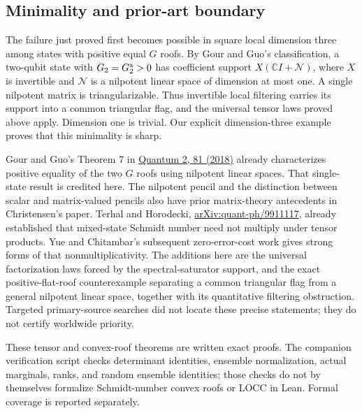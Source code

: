 \subsection{Minimality and prior-art boundary}

The failure just proved first becomes possible in square local dimension
three among states with positive equal $G$ roofs. By Gour and Guo's
classification, a two-qubit state with $G_2=G_2^{\rm a}>0$ has coefficient
support $X(\mathbb CI+\mathcal N)$, where $X$ is invertible and
$\mathcal N$ is a nilpotent linear space of dimension at most one.
A single nilpotent matrix is triangularizable. Thus invertible local
filtering carries its support into a common triangular flag, and the
universal tensor laws proved above apply. Dimension one is trivial.
Our explicit dimension-three example proves that this minimality is sharp.

Gour and Guo's Theorem 7 in
\href{https://quantum-journal.org/papers/q-2018-08-13-81/}{Quantum 2, 81 (2018)}
already characterizes positive equality of the two $G$ roofs using
nilpotent linear spaces. That single-state result is credited here.
The nilpotent pencil and the distinction between scalar and matrix-valued
pencils also have prior matrix-theory antecedents in Christensen's paper.
Terhal and Horodecki,
\href{https://arxiv.org/abs/quant-ph/9911117}{arXiv:quant-ph/9911117},
already established that mixed-state Schmidt number need not multiply
under tensor products. Yue and Chitambar's subsequent zero-error-cost
work gives strong forms of that nonmultiplicativity. The additions here
are the universal factorization laws forced by the spectral-saturator
support, and the exact positive-flat-roof counterexample separating a
common triangular flag from a general nilpotent linear space, together
with its quantitative filtering obstruction. Targeted primary-source
searches did not locate these precise statements; they do not certify
worldwide priority.

These tensor and convex-roof theorems are written exact proofs. The
companion verification script checks determinant identities, ensemble
normalization, actual marginals, ranks, and random ensemble identities;
those checks do not by themselves formalize Schmidt-number convex roofs
or LOCC in Lean. Formal coverage is reported separately.
